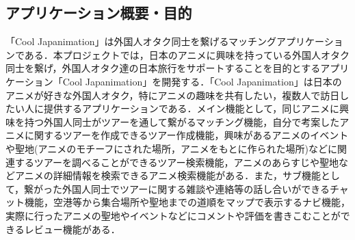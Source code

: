 \subsection{アプリケーション概要・目的}
\par
「Cool Japanimation」は外国人オタク同士を繋げるマッチングアプリケーションである．本プロジェクトでは，日本のアニメに興味を持っている外国人オタク同士を繋げ，外国人オタク達の日本旅行をサポートすることを目的とするアプリケーション「Cool Japanimation」を開発する．「Cool Japanimation」は日本のアニメが好きな外国人オタク，特にアニメの趣味を共有したい，複数人で訪日したい人に提供するアプリケーションである．メイン機能として，同じアニメに興味を持つ外国人同士がツアーを通して繋がるマッチング機能，自分で考案したアニメに関するツアーを作成できるツアー作成機能，興味があるアニメのイベントや聖地(アニメのモチーフにされた場所，アニメをもとに作られた場所)などに関連するツアーを調べることができるツアー検索機能，アニメのあらすじや聖地などアニメの詳細情報を検索できるアニメ検索機能がある．また，サブ機能として，繋がった外国人同士でツアーに関する雑談や連絡等の話し合いができるチャット機能，空港等から集合場所や聖地までの道順をマップで表示するナビ機能，実際に行ったアニメの聖地やイベントなどにコメントや評価を書きこむことができるレビュー機能がある．

